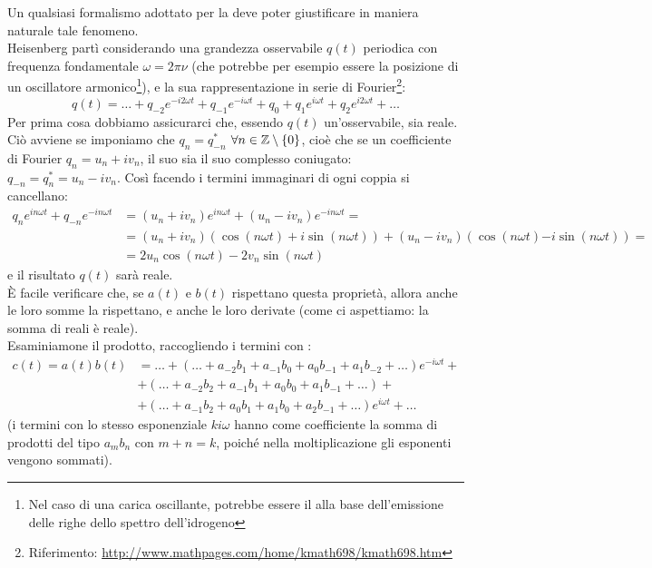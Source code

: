 \documentclass[FisicaTeorica.tex]{subfiles}
\begin{document}
Un qualsiasi formalismo adottato per la \MQ deve poter giustificare in maniera naturale tale fenomeno.\\
Heisenberg partì considerando una grandezza osservabile $q(t)$ periodica con frequenza fondamentale $\omega = 2\pi\nu$ (che potrebbe per esempio essere la posizione di un oscillatore armonico\footnote{Nel caso di una carica oscillante, potrebbe essere il  alla base dell'emissione delle righe dello spettro dell'idrogeno}), e la sua rappresentazione in serie di Fourier\footnote{Riferimento: \href{http://www.mathpages.com/home/kmath698/kmath698.htm}{http://www.mathpages.com/home/kmath698/kmath698.htm}}:
\[
q(t) = \dots + q_{-2}e^{-i2\omega t} + q_{-1}e^{-i\omega t} + q_0 + q_1 e^{i\omega t} + q_2 e^{i2\omega t} + \dots
\]
Per prima cosa dobbiamo assicurarci che, essendo $q(t)$ un'osservabile, sia reale. Ciò avviene se imponiamo che $q_n = q_{-n}^*$ $\forall n\in \mathbb{Z}\setminus\{0\}$, cioè che se un coefficiente di Fourier $q_n = u_n + iv_n$, il suo  sia il suo complesso coniugato: $q_{-n} = q_{n}^* = u_n - iv_n$. Così facendo i termini immaginari di ogni coppia si cancellano:
\begin{align*}
q_n e^{in\omega t} + q_{-n}e^{-in\omega t} &= (u_n + iv_n)e^{in\omega t} + (u_n - iv_n)e^{-in\omega t} =\\
&= (u_n + iv_n)(\cos(n\omega t)+i\sin(n\omega t)) + (u_n-iv_n)(\cos(n\omega t) \bm{-} i\sin(n\omega t)) =\\
&= 2u_n\cos(n\omega t)-2v_n\sin(n\omega t)
\end{align*}
e il risultato $q(t)$ sarà reale.\\
È facile verificare che, se $a(t)$ e $b(t)$ rispettano questa proprietà, allora anche le loro somme la rispettano, e anche le loro derivate (come ci aspettiamo: la somma di reali è reale).\\
Esaminiamone il prodotto, raccogliendo i termini con :
\begin{align*}
c(t) = a(t)b(t) &= \dots + (\dots +a_{-2}b_1 + a_{-1}b_0 + a_0 b_{-1} + a_1 b_{-2} + \dots )e^{-i\omega t} +\\
&+ (\dots +a_{-2}b_2 + a_{-1}b_1 + a_0 b_0 + a_1 b_{-1} + \dots ) + \\
&+ (\dots +a_{-1}b_2 + a_{0}b_1 + a_1 b_{0} + a_2 b_{-1} + \dots ) e^{i\omega t} + \dots
\end{align*}
(i termini con lo stesso esponenziale $ki\omega$ hanno come coefficiente la somma di prodotti del tipo $a_m b_n$ con $m+n=k$, poiché nella moltiplicazione gli esponenti vengono sommati).\\
\end{document}
